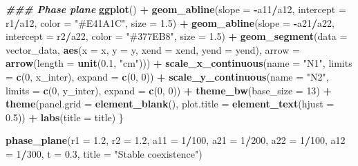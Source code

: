 \documentclass[
]{book}
\newenvironment{Shaded}{\begin{snugshade}}{\end{snugshade}}
\newcommand{\AttributeTok}[1]{\textcolor[rgb]{0.13,0.29,0.53}{#1}}
\newcommand{\DecValTok}[1]{\textcolor[rgb]{0.00,0.00,0.81}{#1}}
\newcommand{\DocumentationTok}[1]{\textcolor[rgb]{0.56,0.35,0.01}{\textbf{\textit{#1}}}}
\newcommand{\FloatTok}[1]{\textcolor[rgb]{0.00,0.00,0.81}{#1}}
\newcommand{\FunctionTok}[1]{\textcolor[rgb]{0.13,0.29,0.53}{\textbf{#1}}}
\newcommand{\NormalTok}[1]{#1}
\newcommand{\SpecialCharTok}[1]{\textcolor[rgb]{0.81,0.36,0.00}{\textbf{#1}}}
\newcommand{\StringTok}[1]{\textcolor[rgb]{0.31,0.60,0.02}{#1}}
\begin{document}
\begin{Shaded}
\begin{Highlighting}[]
    \DocumentationTok{\#\#\# Phase plane}
    \FunctionTok{ggplot}\NormalTok{() }\SpecialCharTok{+}
      \FunctionTok{geom\_abline}\NormalTok{(}\AttributeTok{slope =} \SpecialCharTok{{-}}\NormalTok{a11}\SpecialCharTok{/}\NormalTok{a12, }\AttributeTok{intercept =}\NormalTok{ r1}\SpecialCharTok{/}\NormalTok{a12, }\AttributeTok{color =} \StringTok{"\#E41A1C"}\NormalTok{, }\AttributeTok{size =} \FloatTok{1.5}\NormalTok{) }\SpecialCharTok{+}
      \FunctionTok{geom\_abline}\NormalTok{(}\AttributeTok{slope =} \SpecialCharTok{{-}}\NormalTok{a21}\SpecialCharTok{/}\NormalTok{a22, }\AttributeTok{intercept =}\NormalTok{ r2}\SpecialCharTok{/}\NormalTok{a22, }\AttributeTok{color =} \StringTok{"\#377EB8"}\NormalTok{, }\AttributeTok{size =} \FloatTok{1.5}\NormalTok{) }\SpecialCharTok{+}
      \FunctionTok{geom\_segment}\NormalTok{(}\AttributeTok{data =}\NormalTok{ vector\_data,}
                   \FunctionTok{aes}\NormalTok{(}\AttributeTok{x =}\NormalTok{ x, }\AttributeTok{y =}\NormalTok{ y, }\AttributeTok{xend =}\NormalTok{ xend, }\AttributeTok{yend =}\NormalTok{ yend),}
                   \AttributeTok{arrow =} \FunctionTok{arrow}\NormalTok{(}\AttributeTok{length =} \FunctionTok{unit}\NormalTok{(}\FloatTok{0.1}\NormalTok{, }\StringTok{"cm"}\NormalTok{))) }\SpecialCharTok{+}    
      \FunctionTok{scale\_x\_continuous}\NormalTok{(}\AttributeTok{name =} \StringTok{"N1"}\NormalTok{, }\AttributeTok{limits =} \FunctionTok{c}\NormalTok{(}\DecValTok{0}\NormalTok{, x\_inter), }\AttributeTok{expand =} \FunctionTok{c}\NormalTok{(}\DecValTok{0}\NormalTok{, }\DecValTok{0}\NormalTok{)) }\SpecialCharTok{+}
      \FunctionTok{scale\_y\_continuous}\NormalTok{(}\AttributeTok{name =} \StringTok{"N2"}\NormalTok{, }\AttributeTok{limits =} \FunctionTok{c}\NormalTok{(}\DecValTok{0}\NormalTok{, y\_inter), }\AttributeTok{expand =} \FunctionTok{c}\NormalTok{(}\DecValTok{0}\NormalTok{, }\DecValTok{0}\NormalTok{)) }\SpecialCharTok{+}
      \FunctionTok{theme\_bw}\NormalTok{(}\AttributeTok{base\_size =} \DecValTok{13}\NormalTok{) }\SpecialCharTok{+}
      \FunctionTok{theme}\NormalTok{(}\AttributeTok{panel.grid =} \FunctionTok{element\_blank}\NormalTok{(),}
            \AttributeTok{plot.title =} \FunctionTok{element\_text}\NormalTok{(}\AttributeTok{hjust =} \FloatTok{0.5}\NormalTok{)) }\SpecialCharTok{+}
      \FunctionTok{labs}\NormalTok{(}\AttributeTok{title =}\NormalTok{ title)}
\NormalTok{  \}}

  \FunctionTok{phase\_plane}\NormalTok{(}\AttributeTok{r1 =} \FloatTok{1.2}\NormalTok{, }\AttributeTok{r2 =} \FloatTok{1.2}\NormalTok{, }\AttributeTok{a11 =} \DecValTok{1}\SpecialCharTok{/}\DecValTok{100}\NormalTok{, }\AttributeTok{a21 =} \DecValTok{1}\SpecialCharTok{/}\DecValTok{200}\NormalTok{, }\AttributeTok{a22 =} \DecValTok{1}\SpecialCharTok{/}\DecValTok{100}\NormalTok{, }\AttributeTok{a12 =} \DecValTok{1}\SpecialCharTok{/}\DecValTok{300}\NormalTok{, }\AttributeTok{t =} \FloatTok{0.3}\NormalTok{, }\AttributeTok{title =} \StringTok{"Stable coexistence"}\NormalTok{)}
\end{Highlighting}
\end{Shaded}
\end{document}

